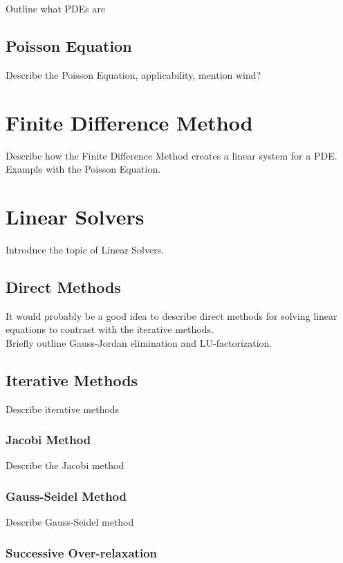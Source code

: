 Outline what PDEs are

\subsection*{Poisson Equation}

Describe the Poisson Equation, applicability, mention wind?

\section*{Finite Difference Method}

Describe how the Finite Difference Method creates a linear system for a PDE. \\
Example with the Poisson Equation.

\section*{Linear Solvers}

Introduce the topic of Linear Solvers.

\subsection*{Direct Methods}

It would probably be a good idea to describe direct methods for solving linear equations to contrast with the iterative methods. \\
Briefly outline Gauss-Jordan elimination and LU-factorization. 

\subsection*{Iterative Methods}

Describe iterative methods

\subsubsection*{Jacobi Method}

Describe the Jacobi method

\subsubsection*{Gauss-Seidel Method}

Describe Gauss-Seidel method

\subsubsection*{Successive Over-relaxation}

